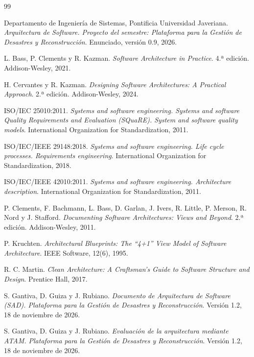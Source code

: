 \documentclass[11pt,letterpaper]{article}
\begin{document}
\begingroup
\renewcommand{\section}[2]{}
\begin{thebibliography}{99}

Departamento de Ingeniería de Sistemas, Pontificia Universidad Javeriana. \textit{Arquitectura de
Software. Proyecto del semestre: Plataforma para la Gestión de Desastres y Reconstrucción}.
Enunciado, versión 0.9, 2026.

L. Bass, P. Clements y R. Kazman. \textit{Software Architecture in Practice}. 4.ª edición.
Addison-Wesley, 2021.

H. Cervantes y R. Kazman. \textit{Designing Software Architectures: A Practical Approach}. 2.ª
edición. Addison-Wesley, 2024.

ISO/IEC 25010:2011. \textit{Systems and software engineering. Systems and software Quality
Requirements and Evaluation (SQuaRE). System and software quality models}. International
Organization for Standardization, 2011.

ISO/IEC/IEEE 29148:2018. \textit{Systems and software engineering. Life cycle processes.
Requirements engineering}. International Organization for Standardization, 2018.

ISO/IEC/IEEE 42010:2011. \textit{Systems and software engineering. Architecture description}.
International Organization for Standardization, 2011.

P. Clements, F. Bachmann, L. Bass, D. Garlan, J. Ivers, R. Little, P. Merson, R. Nord y J. Stafford.
\textit{Documenting Software Architectures: Views and Beyond}. 2.ª edición. Addison-Wesley, 2011.

P. Kruchten. \textit{Architectural Blueprints: The \enquote{4+1} View Model of Software
Architecture}. IEEE Software, 12(6), 1995.

R. C. Martin. \textit{Clean Architecture: A Craftsman's Guide to Software Structure and Design}.
Prentice Hall, 2017.

S. Gantiva, D. Guiza y J. Rubiano. \textit{Documento de Arquitectura de Software (SAD). Plataforma
para la Gestión de Desastres y Reconstrucción}. Versión 1.2, 18 de noviembre de 2026.

S. Gantiva, D. Guiza y J. Rubiano. \textit{Evaluación de la arquitectura mediante ATAM. Plataforma para
la Gestión de Desastres y Reconstrucción}. Versión 1.2, 18 de noviembre de 2026.


\end{thebibliography}
\end{document}
